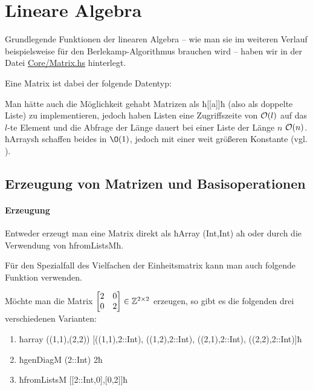 \section{Lineare Algebra}

Grundlegende Funktionen der linearen Algebra -- wie man sie im weiteren Verlauf
beispielsweise für den Berlekamp-Algorithmus brauchen wird -- haben wir in der
Datei \url{Core/Matrix.hs} hinterlegt.

Eine Matrix ist dabei der folgende Datentyp:


Man hätte auch die Möglichkeit gehabt Matrizen als ħ[[a]]ħ (also als doppelte
Liste) zu implementieren, jedoch haben Listen eine Zugriffszeite von $\mathcal{O}(l)$ auf
das $l$-te Element und die Abfrage der Länge dauert bei einer Liste der Länge
$n$ $\mathcal{O}(n)$. ħArraysħ schaffen beides in $\O(1)$, jedoch mit einer
weit größeren Konstante (vgl. \url{}). 

\subsection{Erzeugung von Matrizen und Basisoperationen}

\paragraph{Erzeugung} Entweder erzeugt man eine Matrix direkt als
ħArray (Int,Int) aħ oder durch die Verwendung von ħfromListsMħ.


Für den Spezialfall des Vielfachen der Einheitsmatrix kann man auch folgende
Funktion verwenden.


\begin{beispiel}
  Möchte man die Matrix $\begin{bmatrix} 2 & 0 \\ 0 & 2 \end{bmatrix} \in
  \mathbb{Z}^{2\times 2}$
  erzeugen, so gibt es die folgenden drei verschiedenen Varianten:
  \begin{enumerate}
    \item ħarray ((1,1),(2,2)) [((1,1),2::Int), ((1,2),2::Int), ((2,1),2::Int), ((2,2),2::Int)]ħ
    \item ħgenDiagM (2::Int) 2ħ
    \item ħfromListsM [[2::Int,0],[0,2]]ħ
  \end{enumerate}
\end{beispiel}

